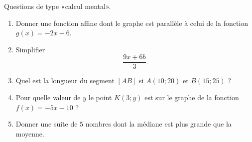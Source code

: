 
\begin{exercice}%
    \label{exosmath-0674}

    Questions de type «calcul mental».
    \begin{multicols}{2}
        \begin{enumerate}
            \item
                Donner une fonction affine dont le graphe est parallèle à celui de la fonction \( g(x)=-2x-6\).
            \item
                Simplifier
                \begin{equation*}
                    \frac{ 9x+6b }{ 3 }.
                \end{equation*}
            \item
                Quel est la longueur du segment \( [AB]\) si \( A(10;20)\) et \( B(15;25)\) ?
            \item
                Pour quelle valeur de \( y\) le point \( K(3;y)\) est sur le graphe de la fonction \( f(x)=-5x-10\) ?
            \item
                Donner une suite de \( 5\) nombres dont la médiane est plus grande que la moyenne.
        \end{enumerate}
    \end{multicols}

\end{exercice}
